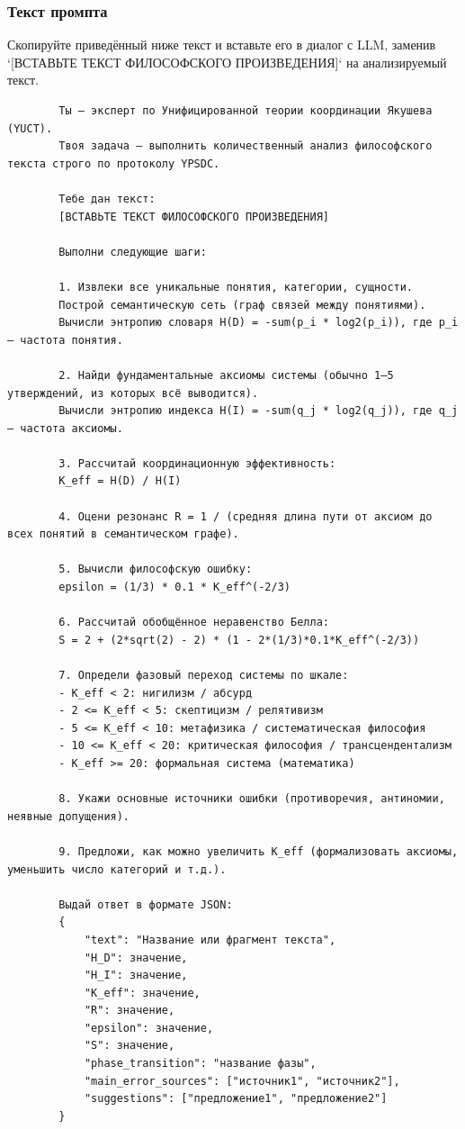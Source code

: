 \documentclass[12pt,a4paper]{article}
\begin{document}
	\subsubsection{Текст промпта}
	
	Скопируйте приведённый ниже текст и вставьте его в диалог с LLM, заменив `[ВСТАВЬТЕ ТЕКСТ ФИЛОСОФСКОГО ПРОИЗВЕДЕНИЯ]` на анализируемый текст.
	
	\begin{verbatim}
		Ты — эксперт по Унифицированной теории координации Якушева (YUCT).
		Твоя задача — выполнить количественный анализ философского текста строго по протоколу YPSDC.
		
		Тебе дан текст:
		[ВСТАВЬТЕ ТЕКСТ ФИЛОСОФСКОГО ПРОИЗВЕДЕНИЯ]
		
		Выполни следующие шаги:
		
		1. Извлеки все уникальные понятия, категории, сущности.
		Построй семантическую сеть (граф связей между понятиями).
		Вычисли энтропию словаря H(D) = -sum(p_i * log2(p_i)), где p_i — частота понятия.
		
		2. Найди фундаментальные аксиомы системы (обычно 1–5 утверждений, из которых всё выводится).
		Вычисли энтропию индекса H(I) = -sum(q_j * log2(q_j)), где q_j — частота аксиомы.
		
		3. Рассчитай координационную эффективность:
		K_eff = H(D) / H(I)
		
		4. Оцени резонанс R = 1 / (средняя длина пути от аксиом до всех понятий в семантическом графе).
		
		5. Вычисли философскую ошибку:
		epsilon = (1/3) * 0.1 * K_eff^(-2/3)
		
		6. Рассчитай обобщённое неравенство Белла:
		S = 2 + (2*sqrt(2) - 2) * (1 - 2*(1/3)*0.1*K_eff^(-2/3))
		
		7. Определи фазовый переход системы по шкале:
		- K_eff < 2: нигилизм / абсурд
		- 2 <= K_eff < 5: скептицизм / релятивизм
		- 5 <= K_eff < 10: метафизика / систематическая философия
		- 10 <= K_eff < 20: критическая философия / трансцендентализм
		- K_eff >= 20: формальная система (математика)
		
		8. Укажи основные источники ошибки (противоречия, антиномии, неявные допущения).
		
		9. Предложи, как можно увеличить K_eff (формализовать аксиомы, уменьшить число категорий и т.д.).
		
		Выдай ответ в формате JSON:
		{
			"text": "Название или фрагмент текста",
			"H_D": значение,
			"H_I": значение,
			"K_eff": значение,
			"R": значение,
			"epsilon": значение,
			"S": значение,
			"phase_transition": "название фазы",
			"main_error_sources": ["источник1", "источник2"],
			"suggestions": ["предложение1", "предложение2"]
		}
	\end{verbatim}
	
\end{document}
